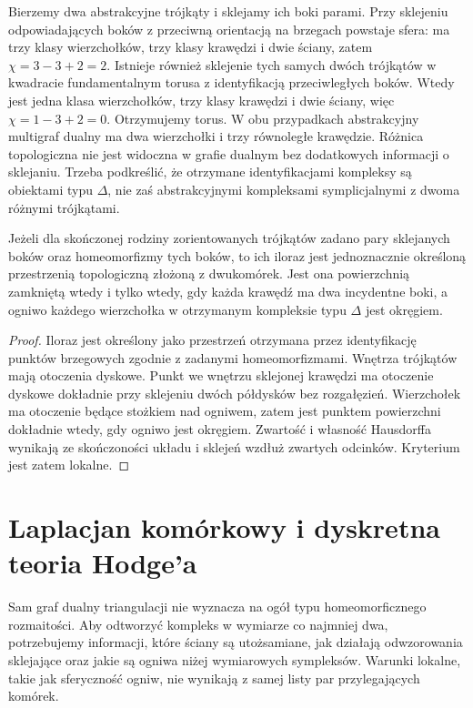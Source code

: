 \begin{przyklad}
Bierzemy dwa abstrakcyjne trójkąty i sklejamy ich
boki parami. Przy sklejeniu odpowiadających boków
z przeciwną orientacją na brzegach powstaje sfera:
ma trzy klasy wierzchołków, trzy klasy krawędzi
i dwie ściany, zatem $\chi=3-3+2=2$.
Istnieje również sklejenie tych samych dwóch trójkątów
w kwadracie fundamentalnym torusa z identyfikacją
przeciwległych boków. Wtedy jest jedna klasa wierzchołków,
trzy klasy krawędzi i dwie ściany, więc
$\chi=1-3+2=0$. Otrzymujemy torus.
W obu przypadkach abstrakcyjny multigraf dualny
ma dwa wierzchołki i trzy równoległe krawędzie.
Różnica topologiczna nie jest widoczna w grafie
dualnym bez dodatkowych informacji o sklejaniu.
Trzeba podkreślić, że otrzymane identyfikacjami
kompleksy są obiektami typu $\Delta$, nie zaś
abstrakcyjnymi kompleksami symplicjalnymi z dwoma
różnymi trójkątami.
\end{przyklad}

\begin{stwierdzenie}
Jeżeli dla skończonej rodziny zorientowanych trójkątów
zadano pary sklejanych boków oraz homeomorfizmy
tych boków, to ich iloraz jest jednoznacznie określoną
przestrzenią topologiczną złożoną z dwukomórek.
Jest ona powierzchnią zamkniętą wtedy i tylko wtedy,
gdy każda krawędź ma dwa incydentne boki, a ogniwo
każdego wierzchołka w otrzymanym kompleksie typu
$\Delta$ jest okręgiem.
\end{stwierdzenie}

\begin{proof}
Iloraz jest określony jako przestrzeń otrzymana przez
identyfikację punktów brzegowych zgodnie z zadanymi
homeomorfizmami. Wnętrza trójkątów mają otoczenia
dyskowe. Punkt we wnętrzu sklejonej krawędzi ma
otoczenie dyskowe dokładnie przy sklejeniu dwóch
półdysków bez rozgałęzień. Wierzchołek ma otoczenie
będące stożkiem nad ogniwem, zatem jest punktem
powierzchni dokładnie wtedy, gdy ogniwo jest
okręgiem. Zwartość i własność Hausdorffa wynikają
ze skończoności układu i sklejeń wzdłuż zwartych
odcinków. Kryterium jest zatem lokalne.
\end{proof}

\section{Laplacjan komórkowy i dyskretna teoria Hodge'a}
\label{sec:tg-cellular-hodge}

\begin{uwaga}
Sam graf dualny triangulacji nie wyznacza na ogół typu
homeomorficznego rozmaitości. Aby odtworzyć kompleks
w wymiarze co najmniej dwa, potrzebujemy informacji,
które ściany są utożsamiane, jak działają odwzorowania
sklejające oraz jakie są ogniwa niżej wymiarowych sympleksów.
Warunki lokalne, takie jak sferyczność ogniw, nie wynikają
z samej listy par przylegających komórek.
\end{uwaga}

